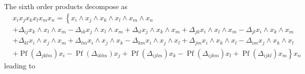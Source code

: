 \documentclass[aps, preprint]{revtex4}
\begin{document}
The sixth order products decompose as
\begin{align} & x_{i} x_{j} x_{k} x_{l} x_{m} x_{n} =\left \{x_{i} \wedge x_{j} \wedge x_{k} \wedge x_{l} \wedge x_{m} \wedge x_{n}\right . \nonumber  \\
 &  + \Delta _{i j}x_{k} \wedge x_{l} \wedge x_{m} - \Delta _{i k}x_{j} \wedge x_{l} \wedge x_{m} + \Delta _{i l}x_{j} \wedge x_{k} \wedge x_{m} + \Delta _{j k}x_{i} \wedge x_{l} \wedge x_{m} - \Delta _{j l}x_{i} \wedge x_{k} \wedge x_{m} \nonumber  \\
 &  + \Delta _{k l}x_{i} \wedge x_{j} \wedge x_{m} + \Delta _{l m}x_{i} \wedge x_{j} \wedge x_{k} - \Delta _{k m}x_{i} \wedge x_{j} \wedge x_{l} + \Delta _{j m}x_{i} \wedge x_{k} \wedge x_{l} - \Delta _{i m}x_{j} \wedge x_{k} \wedge x_{l} \nonumber  \\
 &  +\left .\ensuremath{\operatorname*{Pf}} \left ( \Delta _{j k l m}\right ) x_{i} -\ensuremath{\operatorname*{Pf}} \left ( \Delta _{i k l m}\right ) x_{j} +\ensuremath{\operatorname*{Pf}} \left ( \Delta _{i j l m}\right ) x_{k} -\ensuremath{\operatorname*{Pf}} \left ( \Delta _{i j k m}\right ) x_{l} +\ensuremath{\operatorname*{Pf}} \left ( \Delta _{i j k l}\right ) x_{m}\right \} x_{n}\end{align}leading to
\end{document}
